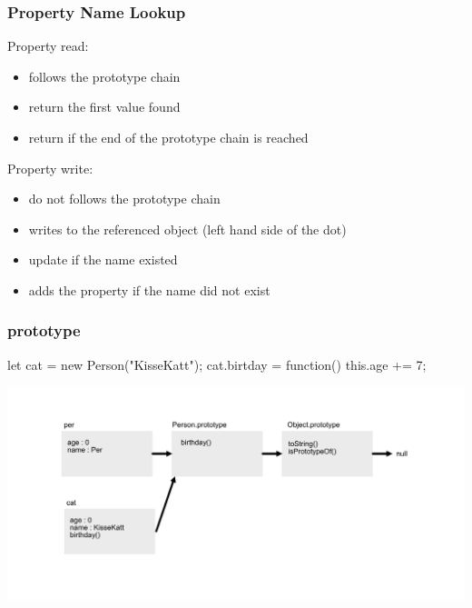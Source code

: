 \begin{frame}[fragile] \frametitle{Property Name Lookup}
Property read:
\begin{itemize}
  \item follows the prototype chain
  \item return the first value found
  \item return  if the end of the prototype chain is reached
\end{itemize}
\vspace{8mm}
Property write:
\begin{itemize}
  \item do not follows the prototype chain
  \item writes to the referenced object (left hand side of the dot)
  \item update if the name existed
  \item adds the property if the name did not exist
\end{itemize}
\end{frame}

\begin{frame}[fragile] \frametitle{prototype}
\begin{CodeBox}{}
let cat = new Person("KisseKatt");
cat.birtday = function() { this.age += 7; }
\end{CodeBox}
  \centering
  \includegraphics[width=14cm]{img/prototype_chain4}
\end{frame}

